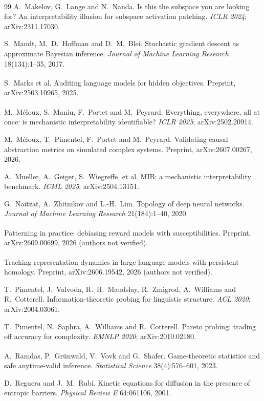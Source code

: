 \documentclass[11pt,a4paper]{article}
\newcommand{\unv}{\textsuperscript{\dag}}
\begin{document}
\begin{thebibliography}{99}
\unv{} A.~Makelov, G.~Lange and N.~Nanda. Is this the
subspace you are looking for? An interpretability illusion for subspace
activation patching. \emph{ICLR 2024}; arXiv:2311.17030.

 S.~Mandt, M.~D.~Hoffman and D.~M.~Blei. Stochastic
gradient descent as approximate Bayesian inference. \emph{Journal of
Machine Learning Research} 18(134):1--35, 2017.

\unv{} S.~Marks et al. Auditing language models for
hidden objectives. Preprint, arXiv:2503.10965, 2025.

\unv{} M.~M\'eloux, S.~Maniu, F.~Portet and
M.~Peyrard. Everything, everywhere, all at once: is mechanistic
interpretability identifiable? \emph{ICLR 2025}; arXiv:2502.20914.

 M.~M\'eloux, T.~Pimentel, F.~Portet and M.~Peyrard.
Validating causal abstraction metrics on simulated complex systems.
Preprint, arXiv:2607.00267, 2026.

 A.~Mueller, A.~Geiger, S.~Wiegreffe, et al. MIB: a
mechanistic interpretability benchmark. \emph{ICML 2025};
arXiv:2504.13151.

 G.~Naitzat, A.~Zhitnikov and L.-H.~Lim. Topology of
deep neural networks. \emph{Journal of Machine Learning Research}
21(184):1--40, 2020.

\unv{} Patterning in practice: debiasing
reward models with susceptibilities. Preprint, arXiv:2609.00699, 2026
(authors not verified).

\unv{} Tracking representation dynamics in large
language models with persistent homology. Preprint, arXiv:2606.19542, 2026
(authors not verified).

 T.~Pimentel, J.~Valvoda, R.~H.~Maudslay,
R.~Zmigrod, A.~Williams and R.~Cotterell. Information-theoretic probing
for linguistic structure. \emph{ACL 2020}; arXiv:2004.03061.

 T.~Pimentel, N.~Saphra, A.~Williams and
R.~Cotterell. Pareto probing: trading off accuracy for complexity.
\emph{EMNLP 2020}; arXiv:2010.02180.

\unv{} A.~Ramdas, P.~Gr\"unwald, V.~Vovk and G.~Shafer.
Game-theoretic statistics and safe anytime-valid inference.
\emph{Statistical Science} 38(4):576--601, 2023.

 D.~Reguera and J.~M.~Rub\'i. Kinetic equations for
diffusion in the presence of entropic barriers. \emph{Physical Review E}
64:061106, 2001.


\end{thebibliography}
\end{document}
